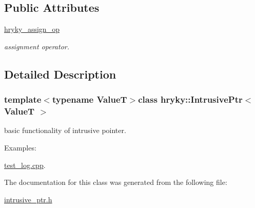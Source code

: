 \subsection*{Public Attributes}
\begin{DoxyCompactItemize}
\item 
\hypertarget{classhryky_1_1_intrusive_ptr_ad39318445053f6b4e15bdc2580881622}{\hyperlink{classhryky_1_1_intrusive_ptr_ad39318445053f6b4e15bdc2580881622}{hryky\-\_\-assign\-\_\-op}}\label{classhryky_1_1_intrusive_ptr_ad39318445053f6b4e15bdc2580881622}

\begin{DoxyCompactList}\small\item\em assignment operator. \end{DoxyCompactList}\end{DoxyCompactItemize}


\subsection{Detailed Description}
\subsubsection*{template$<$typename Value\-T$>$class hryky\-::\-Intrusive\-Ptr$<$ Value\-T $>$}

basic functionality of intrusive pointer. \begin{Desc}
\item[Examples\-: ]\par
\hyperlink{test_log_8cpp-example}{test\-\_\-log.\-cpp}.\end{Desc}


The documentation for this class was generated from the following file\-:\begin{DoxyCompactItemize}
\item 
\hyperlink{intrusive__ptr_8h}{intrusive\-\_\-ptr.\-h}\end{DoxyCompactItemize}
